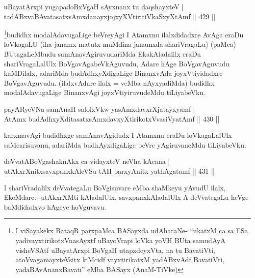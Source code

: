 \begin{shl}
uBayatArxpi yugapadoBxVgaH sAyxnanx tu daqshayxteV | \\
tadABxvaBAvatasatxsAmxdanayxjojxyXVtiritiVkaSxyXtAmf \hfill||  429 ||  
\end{shl}

\begin{artha}
\footnote{I viSayakekx BataqR parxpaMca BASayxda udAharaNe- ``ukatxM ca sa ESa yadivayxtirikotxVnasAyxtf uBayoVrapi loVka yoVH BUta samudAyA visheVSAtf uBayatArxpi BoVgaH utapxdeyxVta, na tu BavatiVti, atoV\s vagamayxteV\s sitx kiMcidf vayxtirikatxM yadABxvAdf BavatiVti, yadaBAvAnanxBavati'' eMba BASayx (AnaM-TiVke)}budidhx modalAdavugaLige beVreyAgi I Atamxnu ilalxdidadxre AvAga eraDu loVkagaLU (iha janamx matutx muMdina janamxda shariVragaLu) (paMca) BUtagaLeMbudu samAnavAgiruvudariMda EkakAladalilx eraDu shariVragaLalUlx BoVgavAgabeVkAguvudu, Adare hAge BoVgavAguvudu kaMDilalx, adariMda budAdhxyXdigaLige BinanxvAda joyxVtiyidadxre BoVgavAguvudu. (ilalxvAdare ilalx =  veMba nAyxyadiMda) budidhx modalAdavugaLige BinanxvAgi joyxVtiyiruvudeMdu tiLiyabeVku.
\end{artha}

\begin{shl}
payARyeVNa samAnaH salolxVkw yasAmxdavxrXjatayxyamf | \\
AtAmx budAdhxyXditasatxsAmxdavxyXtirikotxV\s vasiVyatAmf \hfill||  430 || 
\end{shl}

\begin{artha}
karxmavAgi budidhxge samAnavAgidudx I Atamxnu eraDu loVkagaLalUlx saMcarisuvanu, adariMda budhAyxdigaLige beVre yAgiruvaneMdu tiLiyabeVku.
\end{artha}


\begin{shl}
deVvatABoVgashaknAkx ca vidayxteV neVha kAcana | \\
utAkxrXnitxsavxpanxkAleVSu tAH parxyAnitx yathAgatamf \hfill||  431 ||  
\end{shl}

\begin{artha}
I shariVradalilx deVvategaLu BoVgisuvare eMba shaMkeyu yAvudU ilalx, EkeMdare:- utAkxrXMti kAladalUlx, savxpanxkAladalUlx A deVvategaLu heVge baMdidadxvo hAgeye hoVguvavu.
\end{artha}


